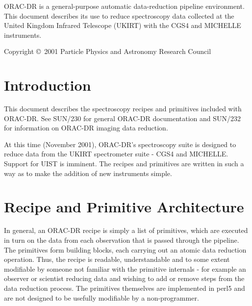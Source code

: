 \documentclass[twoside,11pt]{article}
\newcommand{\stardocinitials}  {SUN}
\newcommand{\stardoccopyright} {Copyright \copyright\ 2001 Particle Physics and Astronomy Research Council}
\newcommand{\stardocnumber}    {236.1}
\newcommand{\stardocabstract}  {ORAC-DR is a
general-purpose automatic data-reduction pipeline environment.  This
document describes its use to reduce spectroscopy data collected at the
United Kingdom Infrared Telescope (UKIRT) with the CGS4 and MICHELLE
instruments. }
\newcommand{\stardocname}{\stardocinitials /\stardocnumber}
\newenvironment{latexonly}{}{}
\newcommand{\xref}[3]{#1}
\renewcommand{\_}{\texttt{\symbol{95}}}
\renewcommand{\thepage}{\roman{page}}
\begin{document}
\stardocabstract

\begin{latexonly}
\newpage
\vspace*{\fill}
\stardoccopyright
\end{latexonly}

  \newpage
  \begin{latexonly}
    \setlength{\parskip}{0mm}
    \tableofcontents
    \setlength{\parskip}{\medskipamount}
    \markboth{\stardocname}{\stardocname}
  \end{latexonly}

\cleardoublepage
\renewcommand{\thepage}{\arabic{page}}
\setcounter{page}{1}


\section{Introduction}

This document describes the spectroscopy recipes and primitives included with
ORAC-DR. See \xref{SUN/230}{sun230}{} for general ORAC-DR documentation and
\xref{SUN/232}{sun232}{} for information on ORAC-DR imaging data reduction.

At this time (November 2001), ORAC-DR's spectroscopy suite is designed
to reduce data from the UKIRT spectrometer suite - CGS4 and
MICHELLE. Support for UIST is imminent. The recipes and primitives
are written in such a way as to make the addition of new instruments
simple.

\section{Recipe and Primitive Architecture}

In general, an ORAC-DR recipe is simply a list of primitives, which
are executed in turn on the data from each observation that is passed
through the pipeline. The primitives form building blocks, each
carrying out an atomic data reduction operation. Thus, the recipe is
readable, understandable and to some extent modifiable by someone not
familiar with the primitive internals - for example an observer or
scientist reducing data and wishing to add or remove steps from the
data reduction process. The primitives themselves are implemented in
perl5 and are not designed to be usefully modifiable by a
non-programmer.
\end{document}
